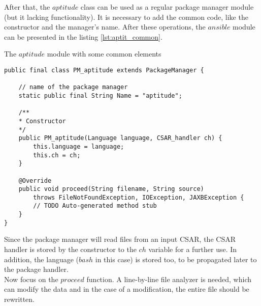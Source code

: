 After that, the $aptitude$ class can be used as a regular package manager module (but it lacking functionality).
It is necessary to add the common code, like the constructor and the manager's name.
After these operations, the $ansible$ module can be presented in the listing \ref{lst:aptit_common}.\\

\begin{Listing} 
\caption{The $aptitude$ module with some common elements}
\label{lst:aptit_common}
\begin{lstlisting}
public final class PM_aptitude extends PackageManager {

	// name of the package manager
	static public final String Name = "aptitude";
	
	/**
	* Constructor
	*/
	public PM_aptitude(Language language, CSAR_handler ch) {
		this.language = language;
		this.ch = ch;
	}
	
	@Override
	public void proceed(String filename, String source)
		throws FileNotFoundException, IOException, JAXBException {
		// TODO Auto-generated method stub
	}
}
\end{lstlisting}
\end{Listing} 
Since the package manager will read files from an input CSAR, the CSAR handler is stored by the constructor to the $ch$ variable for a further use.
In addition, the language ($bash$ in this case) is stored too, to be propagated later to the package handler.\\
Now focus on the $proceed$ function.
A line-by-line file analyzer is needed, which can modify the data and in the case of a modification, the entire file should be rewritten.

